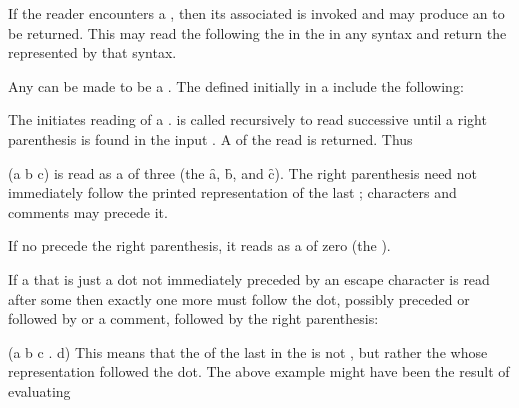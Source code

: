 
If the reader encounters a ,
then its associated  
is invoked and may produce an  to be returned.
This  may read the  
following the  in the  
in any syntax and return the  represented by that syntax.

Any  can be made to be a .
The  defined initially in a 
include
the following:

\idxcode{(}


The  initiates reading of a .
 is called recursively to read successive 
until a right parenthesis is found in the input .
A  of the  read is returned.  Thus

\code
 (a b c)
\endcode
is read as a  of three 
(the  \f{a}, \f{b}, and \f{c}).
The right parenthesis need not immediately follow the printed representation of
the last ;                               
characters and comments may precede it.


If no  precede the right parenthesis, 
it reads as a  of zero  
(the ).

If a  that is just a dot
not immediately preceded by an escape character
is read after some 
then exactly one more  must follow the dot,
possibly preceded or followed by  or a comment,
followed by the right parenthesis:

\code
 (a b c . d)
\endcode
This means that the  of the last  in the 
 is not \nil,
but rather the  whose representation followed the dot.
The above example might have been the result of evaluating

